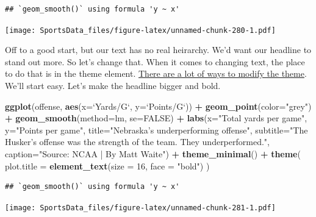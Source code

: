 \documentclass[
]{book}
\newenvironment{Shaded}{\begin{snugshade}}{\end{snugshade}}
\newcommand{\DataTypeTok}[1]{\textcolor[rgb]{0.13,0.29,0.53}{#1}}
\newcommand{\DecValTok}[1]{\textcolor[rgb]{0.00,0.00,0.81}{#1}}
\newcommand{\KeywordTok}[1]{\textcolor[rgb]{0.13,0.29,0.53}{\textbf{#1}}}
\newcommand{\NormalTok}[1]{#1}
\newcommand{\OperatorTok}[1]{\textcolor[rgb]{0.81,0.36,0.00}{\textbf{#1}}}
\newcommand{\OtherTok}[1]{\textcolor[rgb]{0.56,0.35,0.01}{#1}}
\newcommand{\StringTok}[1]{\textcolor[rgb]{0.31,0.60,0.02}{#1}}
\begin{document}
\begin{verbatim}
## `geom_smooth()` using formula 'y ~ x'
\end{verbatim}

\texttt{[image: SportsData\_files/figure-latex/unnamed-chunk-280-1.pdf]}

Off to a good start, but our text has no real heirarchy. We'd want our headline to stand out more. So let's change that. When it comes to changing text, the place to do that is in the theme element. \href{http://ggplot2.tidyverse.org/reference/theme.html}{There are a lot of ways to modify the theme}. We'll start easy. Let's make the headline bigger and bold.

\begin{Shaded}
\begin{Highlighting}[]
\KeywordTok{ggplot}\NormalTok{(offense, }\KeywordTok{aes}\NormalTok{(}\DataTypeTok{x=}\StringTok{`}\DataTypeTok{Yards/G}\StringTok{`}\NormalTok{, }\DataTypeTok{y=}\StringTok{`}\DataTypeTok{Points/G}\StringTok{`}\NormalTok{)) }\OperatorTok{+}\StringTok{ }
\StringTok{  }\KeywordTok{geom_point}\NormalTok{(}\DataTypeTok{color=}\StringTok{"grey"}\NormalTok{) }\OperatorTok{+}\StringTok{ }\KeywordTok{geom_smooth}\NormalTok{(}\DataTypeTok{method=}\NormalTok{lm, }\DataTypeTok{se=}\OtherTok{FALSE}\NormalTok{) }\OperatorTok{+}\StringTok{ }
\StringTok{  }\KeywordTok{labs}\NormalTok{(}\DataTypeTok{x=}\StringTok{"Total yards per game"}\NormalTok{, }\DataTypeTok{y=}\StringTok{"Points per game"}\NormalTok{, }\DataTypeTok{title=}\StringTok{"Nebraska's underperforming offense"}\NormalTok{, }\DataTypeTok{subtitle=}\StringTok{"The Husker's offense was the strength of the team. They underperformed."}\NormalTok{, }\DataTypeTok{caption=}\StringTok{"Source: NCAA | By Matt Waite"}\NormalTok{) }\OperatorTok{+}\StringTok{ }
\StringTok{  }\KeywordTok{theme_minimal}\NormalTok{() }\OperatorTok{+}\StringTok{ }
\StringTok{  }\KeywordTok{theme}\NormalTok{(}
    \DataTypeTok{plot.title =} \KeywordTok{element_text}\NormalTok{(}\DataTypeTok{size =} \DecValTok{16}\NormalTok{, }\DataTypeTok{face =} \StringTok{"bold"}\NormalTok{)}
\NormalTok{    ) }
\end{Highlighting}
\end{Shaded}

\begin{verbatim}
## `geom_smooth()` using formula 'y ~ x'
\end{verbatim}

\texttt{[image: SportsData\_files/figure-latex/unnamed-chunk-281-1.pdf]}
\end{document}
